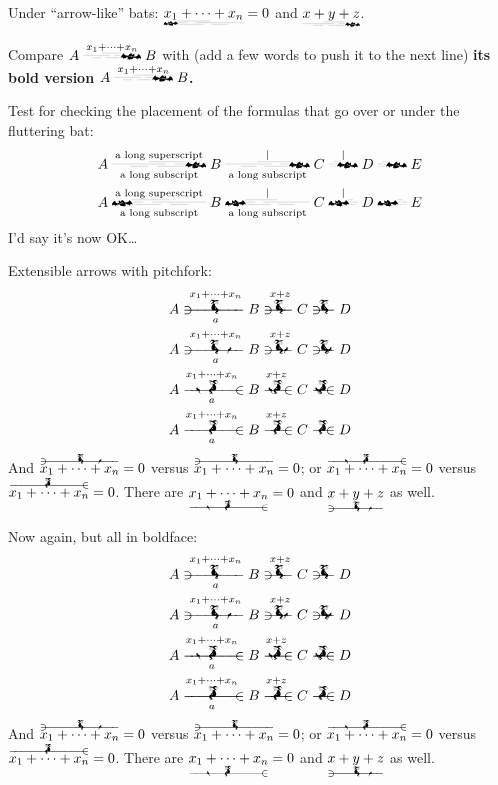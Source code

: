 \documentclass[a4paper]{article}
\newcommand*{\sumxn}{x_{1}+\dots+x_{n}}
\begin{document}
Under ``arrow-like'' bats: \( \underleftflutteringbat{\sumxn}=0 \) and \(
\underrightflutteringbat{x+y+z} \).

Compare \( A\xrightflutteringbat{\sumxn} B \) with (add a few words to push it
to the next line) {\bfseries\boldmath its bold version \(
A\xrightflutteringbat{\sumxn} B \).}

Test for checking the placement of the formulas that go over or under the
fluttering bat:
\begin{gather*}
	A \xrightflutteringbat[\text{a long subscript}]{\text{a long superscript}} B
		\xrightflutteringbat[\text{a long subscript}]{|} C
		\xrightflutteringbat{|} D \xrightflutteringbat{} E  \\
	A \xleftflutteringbat[\text{a long subscript}]{\text{a long superscript}} B
		\xleftflutteringbat[\text{a long subscript}]{|} C
		\xleftflutteringbat{|} D \xleftflutteringbat{} E
\end{gather*}
I'd say it's now OK\@\ldots

\bigbreak

Extensible arrows with pitchfork:
\begin{gather*}
	A \xrightwitchonpitchfork[a]{\sumxn} B \xrightwitchonpitchfork{x+z} C
		\xrightwitchonpitchfork{} D  \\
	A \xrightwitchonpitchfork*[a]{\sumxn} B \xrightwitchonpitchfork*{x+z} C
		\xrightwitchonpitchfork*{} D  \\
	A \xleftwitchonpitchfork*[a]{\sumxn} B \xleftwitchonpitchfork*{x+z} C
		\xleftwitchonpitchfork*{} D  \\
	A \xleftwitchonpitchfork[a]{\sumxn} B \xleftwitchonpitchfork{x+z} C
		\xleftwitchonpitchfork{} D
\end{gather*}
And \( \overrightwitchonpitchfork*{\sumxn}=0 \) versus \(
\overrightwitchonpitchfork{\sumxn}=0 \); or \(
\overleftwitchonpitchfork*{\sumxn}=0 \) versus \(
\overleftwitchonpitchfork{\sumxn}=0 \).  There are \(
\underleftwitchonpitchfork*{\sumxn}=0 \) and \(
\underrightwitchonpitchfork*{x+y+z} \) as well.

\begingroup

\bfseries {}

Now again, but all in boldface:
\begin{gather*}
	A \xrightwitchonpitchfork[a]{\sumxn} B \xrightwitchonpitchfork{x+z} C
		\xrightwitchonpitchfork{} D  \\
	A \xrightwitchonpitchfork*[a]{\sumxn} B \xrightwitchonpitchfork*{x+z} C
		\xrightwitchonpitchfork*{} D  \\
	A \xleftwitchonpitchfork*[a]{\sumxn} B \xleftwitchonpitchfork*{x+z} C
		\xleftwitchonpitchfork*{} D  \\
	A \xleftwitchonpitchfork[a]{\sumxn} B \xleftwitchonpitchfork{x+z} C
		\xleftwitchonpitchfork{} D
\end{gather*}
And \( \overrightwitchonpitchfork*{\sumxn}=0 \) versus \(
\overrightwitchonpitchfork{\sumxn}=0 \); or \(
\overleftwitchonpitchfork*{\sumxn}=0 \) versus \(
\overleftwitchonpitchfork{\sumxn}=0 \).  There are \(
\underleftwitchonpitchfork*{\sumxn}=0 \) and \(
\underrightwitchonpitchfork*{x+y+z} \) as well.
\end{document}

